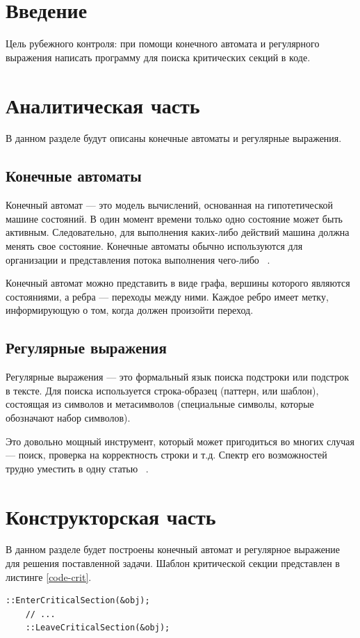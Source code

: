 \documentclass[12pt, a4paper]{report}
\begin{document}
	\tableofcontents

	\chapter*{Введение}
	\hspace{0.5cm}Цель рубежного контроля: при помощи конечного автомата и регулярного выражения
	написать программу для поиска критических секций в коде.

    \chapter{Аналитическая часть}
	\hspace{0.5cm}В данном разделе будут описаны конечные автоматы и регулярные выражения.
	
	\section{Конечные автоматы}
	\hspace{0.5cm}Конечный автомат — это модель вычислений, основанная на гипотетической машине состояний. В один момент времени только одно состояние может быть активным. Следовательно, для выполнения каких-либо действий машина должна менять свое состояние. Конечные автоматы обычно используются для организации и представления потока выполнения чего-либо ~\cite{ka}.
	
	Конечный автомат можно представить в виде графа, вершины которого являются состояниями, а ребра — переходы между ними. Каждое ребро имеет метку, информирующую о том, когда должен произойти переход.

	\section{Регулярные выражения}
	\hspace{0.5cm}Регулярные выражения — это формальный язык поиска подстроки или подстрок в тексте. Для поиска используется строка-образец (паттерн, или шаблон), состоящая из символов и метасимволов (специальные символы, которые обозначают набор символов).
	
	Это довольно мощный инструмент, который может пригодиться во многих случая —
	поиск, проверка на корректность строки и т.д. Спектр его возможностей трудно уместить
	в одну статью ~\cite{regexp}.
	
	\chapter{Конструкторская часть}
	\hspace{0.5cm}В данном разделе будет построены конечный автомат и регулярное выражение для решения поставленной задачи.
	Шаблон критической секции представлен в листинге \ref{code-crit}.
	\begin{lstlisting}[label=code-crit,caption=Шаблон критической секции]
	::EnterCriticalSection(&obj);
	// ...
	::LeaveCriticalSection(&obj);
	\end{lstlisting}
	
\end{document}
